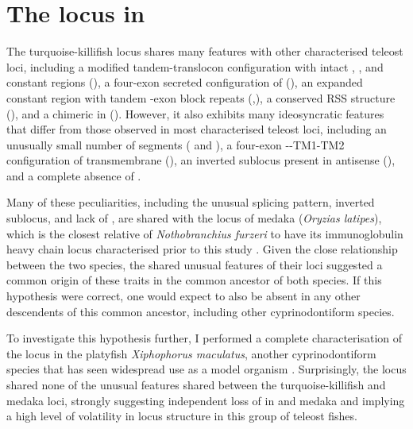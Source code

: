 \section{The \igh{} locus in \xma}
\label{sec:xma-locus}
	
	The turquoise-killifish \igh{} locus shares many features with other characterised teleost loci, including a modified tandem-translocon configuration with intact \vh, \dh, \jh and constant regions (), a four-exon secreted configuration of  (), an expanded  constant region with tandem \cd{}-exon block repeats (,), a conserved RSS structure (), and a chimeric  in  (). However, it also exhibits many ideosyncratic features that differ from those observed in most characterised teleost loci, including an unusually small number of \vh segments ( and ), a four-exon --TM1-TM2 configuration of transmembrane  (), an inverted sublocus present in antisense (), and a complete absence of .
	
Many of these peculiarities, including the unusual  splicing pattern, inverted sublocus, and lack of , are shared with the \igh{} locus of medaka (\textit{Oryzias latipes}), which is the closest relative of \textit{Nothobranchius furzeri} to have its immunoglobulin heavy chain locus characterised prior to this study \parencite{magadan2011medaka}. Given the close relationship between the two species, the shared unusual features of their \igh{} loci suggested a common origin of these traits  in the common ancestor of both species. If this hypothesis were correct, one would expect  to also be absent in any other descendents of this common ancestor, including other cyprinodontiform species.

To investigate this hypothesis further, I performed a complete characterisation of the \igh{} locus in the platyfish \textit{Xiphophorus maculatus}, another cyprinodontiform species that has seen widespread use as a model organism \parencite{schartl2013platyfish}. Surprisingly, the \Xma locus shared none of the unusual features shared between the turquoise-killifish and medaka loci, strongly suggesting independent loss of  in \Nfu and medaka and implying a high level of volatility in \igh{} locus structure in this group of teleost fishes.


